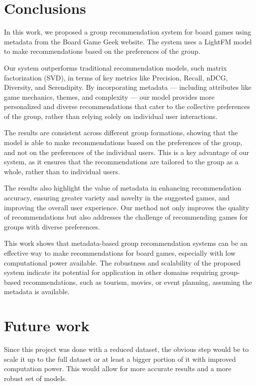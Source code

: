 \documentclass{article}
\begin{document}
\section{Conclusions}

In this work, we proposed a group recommendation system for board games using metadata from the Board Game Geek website. The system uses a LightFM model to make recommendations based on the preferences of the group. 

Our system outperforms traditional recommendation models, such matrix factorization (SVD), in terms of key metrics like Precision, Recall, nDCG, Diversity, and Serendipity. By incorporating metadata — including attributes like game mechanics, themes, and complexity — our model provides more personalized and diverse recommendations that cater to the collective preferences of the group, rather than relying solely on individual user interactions.

The results are consistent across different group formations, showing that the model is able to make recommendations based on the preferences of the group, and not on the preferences of the individual users. This is a key advantage of our system, as it ensures that the recommendations are tailored to the group as a whole, rather than to individual users.

The results also highlight the value of metadata in enhancing recommendation accuracy, ensuring greater variety and novelty in the suggested games, and improving the overall user experience. Our method not only improves the quality of recommendations but also addresses the challenge of recommending games for groups with diverse preferences. 

This work shows that metadata-based group recommendation systems can be an effective way to make recommendations for board games, especially with low computational power available. The robustness and scalability of the proposed system indicate its potential for application in other domains requiring group-based recommendations, such as tourism, movies, or event planning, assuming the metadata is available.

\section{Future work}

Since this project was done with a reduced dataset, the obvious step would be to scale it up to the full dataset or at least a bigger portion of it with improved computation power. This would allow for more accurate results and a more robust set of models.
\end{document}
